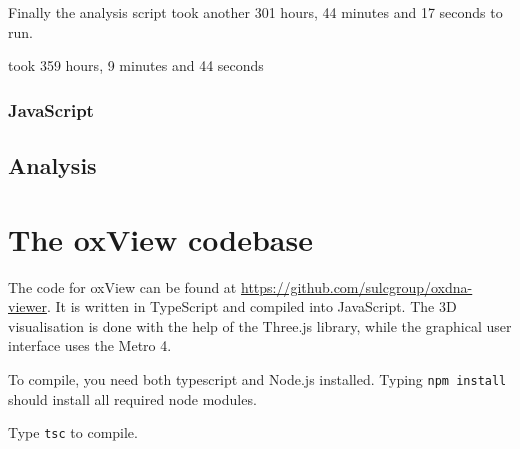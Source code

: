 Finally the analysis script took another 301 hours, 44 minutes and 17 seconds to run.

took 359 hours, 9 minutes and 44 seconds

\subsection{JavaScript}

\section{Analysis}

\chapter{The oxView codebase}

The code for oxView can be found at \url{https://github.com/sulcgroup/oxdna-viewer}. It is written in TypeScript and compiled into JavaScript. The 3D visualisation is done with the help of the Three.js library, while the graphical user interface uses the Metro 4. 

To compile, you need both typescript and Node.js installed. Typing \verb|npm install| should install all required node modules.

Type \verb|tsc| to compile. 

\minitoc

